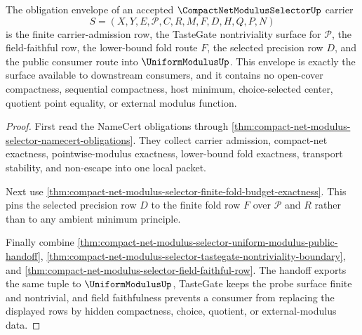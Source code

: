 \begin{theorem}
\label{thm:compact-net-modulus-selector-obligation-envelope}
The obligation envelope of an accepted $\CompactNetModulusSelectorUp$ carrier
$$
S=(X,Y,E,\mathcal{P},C,R,M,F,D,H,Q,P,N)
$$
is the finite carrier-admission row, the TasteGate nontriviality surface for $\mathcal{P}$, the field-faithful row, the lower-bound fold route $F$, the selected precision row $D$, and the public consumer route into $\UniformModulusUp$. This envelope is exactly the surface available to downstream consumers, and it contains no open-cover compactness, sequential compactness, host minimum, choice-selected center, quotient point equality, or external modulus function.
\end{theorem}
\begin{proof}
First read the NameCert obligations through \autoref{thm:compact-net-modulus-selector-namecert-obligations}. They collect carrier admission, compact-net exactness, pointwise-modulus exactness, lower-bound fold exactness, transport stability, and non-escape into one local packet.

Next use \autoref{thm:compact-net-modulus-selector-finite-fold-budget-exactness}. This pins the selected precision row $D$ to the finite fold row $F$ over $\mathcal{P}$ and $R$ rather than to any ambient minimum principle.

Finally combine \autoref{thm:compact-net-modulus-selector-uniform-modulus-public-handoff}, \autoref{thm:compact-net-modulus-selector-tastegate-nontriviality-boundary}, and \autoref{thm:compact-net-modulus-selector-field-faithful-row}. The handoff exports the same tuple to $\UniformModulusUp$, TasteGate keeps the probe surface finite and nontrivial, and field faithfulness prevents a consumer from replacing the displayed rows by hidden compactness, choice, quotient, or external-modulus data.
\end{proof}


